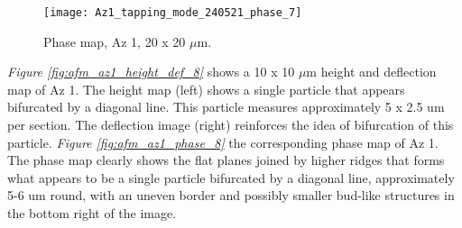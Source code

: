 \begin{figure}[H]
\centering
  \texttt{[image: Az1\_tapping\_mode\_240521\_phase\_7]}
\caption[Phase map, Az 1]{Phase map, Az 1, 20 x 20 $\mu$m.}
\label{fig:afm_az1_phase_7}
\end{figure}


\textit{Figure \ref{fig:afm_az1_height_def_8}} shows a 10 x 10 $\mu$m height and deflection map of Az 1. The height map (left) shows a single particle that appears bifurcated by a diagonal line. This particle measures approximately 5 x 2.5 um per section. The deflection image (right) reinforces the idea of bifurcation of this particle. \textit{Figure \ref{fig:afm_az1_phase_8}} the corresponding phase map of Az 1. The phase map clearly shows the flat planes joined by higher ridges that forms what appears to be a single particle bifurcated by a diagonal line, approximately 5-6 um round, with an uneven border and possibly smaller bud-like structures in the bottom right of the image.



